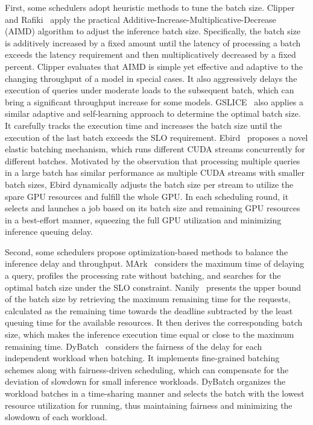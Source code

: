 First, some schedulers adopt heuristic methods to tune the batch size. Clipper~\cite{Daniel2017clipper} and Rafiki~\cite{wang2018rafiki} apply the practical Additive-Increase-Multiplicative-Decrease (AIMD) algorithm to adjust the inference batch size. Specifically, the batch size is additively increased by a fixed amount until the latency of processing a batch exceeds the latency requirement and then multiplicatively decreased by a fixed percent. Clipper evaluates that AIMD is simple yet effective and adaptive to the changing throughput of a model in special cases. It also aggressively delays the execution of queries under moderate loads to the subsequent batch, which can bring a significant throughput increase for some models. GSLICE~\cite{dhakal2020GSLICE} also applies a similar adaptive and self-learning approach to determine the optimal batch size. It carefully tracks the execution time and increases the batch size until the execution of the last batch exceeds the SLO requirement. Ebird~\cite{Ebird,E2bird} proposes a novel elastic batching mechanism, which runs different CUDA streams concurrently for different batches. Motivated by the observation that processing multiple queries in a large batch has similar performance as multiple CUDA streams with smaller batch sizes, Ebird dynamically adjusts the batch size per stream to utilize the spare GPU resources and fulfill the whole GPU. In each scheduling round, it selects and launches a job based on its batch size and remaining GPU resources in a best-effort manner, squeezing the full GPU utilization and minimizing inference queuing delay.

Second, some schedulers propose optimization-based methods to balance the inference delay and throughput.
MArk~\cite{zhang2019mark,zhang2020mark} considers the maximum time of delaying a query, profiles the processing rate without batching, and searches for the optimal batch size under the SLO constraint. Nanily~\cite{tang2019nanily} presents the upper bound of the batch size by retrieving the maximum remaining time for the requests, calculated as the remaining time towards the deadline subtracted by the least queuing time for the available resources. It then derives the corresponding batch size, which makes the inference execution time equal or close to the maximum remaining time. DyBatch~\cite{zhang2020dybatch} considers the fairness of the delay for each independent workload when batching. It implements fine-grained batching schemes along with fairness-driven scheduling, which can compensate for the deviation of slowdown for small inference workloads. DyBatch organizes the workload batches in a time-sharing manner and selects the batch with the lowest resource utilization for running, thus maintaining fairness and minimizing the slowdown of each workload.

